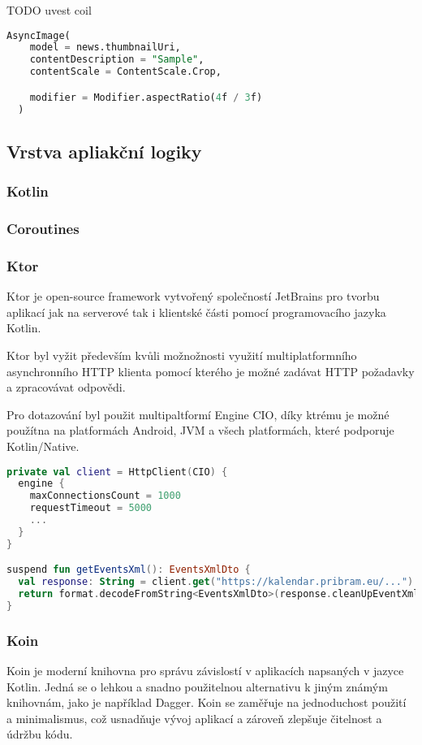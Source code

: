 TODO uvest coil
\begin{lstlisting}[caption={Coil}, label={lst:Coil3}, language=SQL]
  AsyncImage(
    model = news.thumbnailUri,
    contentDescription = "Sample",
    contentScale = ContentScale.Crop,

    modifier = Modifier.aspectRatio(4f / 3f)
  )
\end{lstlisting}

\subsection{Vrstva apliakční logiky}

\subsubsection*{Kotlin}
\subsubsection*{Coroutines}
\subsubsection*{Ktor}
Ktor je open-source framework vytvořený společností JetBrains pro tvorbu aplikací jak na serverové tak i klientské části pomocí programovacího 
jazyka Kotlin.

Ktor byl vyžit především kvůli možnožnosti využití multiplatformního asynchronního HTTP klienta pomocí kterého je možné zadávat HTTP požadavky a 
zpracovávat odpovědi. 

Pro dotazování byl použit multipaltformí Engine CIO, díky ktrému je možné použítna na platformách Android, JVM a všech platformách, které podporuje Kotlin/Native.

\begin{lstlisting}[caption={Definice barevných motivů}, label={lst:colorsDef}, language=Kotlin]
private val client = HttpClient(CIO) {
  engine {
    maxConnectionsCount = 1000
    requestTimeout = 5000
    ...
  }
}

suspend fun getEventsXml(): EventsXmlDto {
  val response: String = client.get("https://kalendar.pribram.eu/...").body()
  return format.decodeFromString<EventsXmlDto>(response.cleanUpEventXml())
}
\end{lstlisting}

\subsubsection*{Koin}
Koin je moderní knihovna pro správu závislostí v aplikacích napsaných v jazyce Kotlin. Jedná se o lehkou a snadno použitelnou alternativu 
k jiným známým knihovnám, jako je například Dagger. Koin se zaměřuje na jednoduchost použití a minimalismus, což usnadňuje vývoj aplikací 
a zároveň zlepšuje čitelnost a údržbu kódu.

